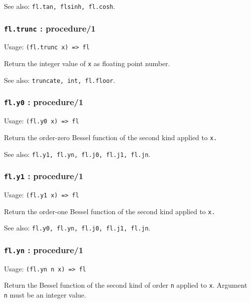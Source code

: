 \documentclass[
]{article}
\newcommand{\passthrough}[1]{#1}
\begin{document}
See also: \passthrough{\lstinline!fl.tan, flsinh, fl.cosh!}.

\hypertarget{fl.trunc-procedure1}{%
\subsubsection{\texorpdfstring{\texttt{fl.trunc} :
procedure/1}{fl.trunc : procedure/1}}\label{fl.trunc-procedure1}}

Usage: \passthrough{\lstinline!(fl.trunc x) => fl!}

Return the integer value of \passthrough{\lstinline!x!} as floating
point number.

See also: \passthrough{\lstinline!truncate, int, fl.floor!}.

\hypertarget{fl.y0-procedure1}{%
\subsubsection{\texorpdfstring{\texttt{fl.y0} :
procedure/1}{fl.y0 : procedure/1}}\label{fl.y0-procedure1}}

Usage: \passthrough{\lstinline!(fl.y0 x) => fl!}

Return the order-zero Bessel function of the second kind applied to
\passthrough{\lstinline!x.!}

See also: \passthrough{\lstinline!fl.y1, fl.yn, fl.j0, fl.j1, fl.jn!}.

\hypertarget{fl.y1-procedure1}{%
\subsubsection{\texorpdfstring{\texttt{fl.y1} :
procedure/1}{fl.y1 : procedure/1}}\label{fl.y1-procedure1}}

Usage: \passthrough{\lstinline!(fl.y1 x) => fl!}

Return the order-one Bessel function of the second kind applied to
\passthrough{\lstinline!x.!}

See also: \passthrough{\lstinline!fl.y0, fl.yn, fl.j0, fl.j1, fl.jn!}.

\hypertarget{fl.yn-procedure1}{%
\subsubsection{\texorpdfstring{\texttt{fl.yn} :
procedure/1}{fl.yn : procedure/1}}\label{fl.yn-procedure1}}

Usage: \passthrough{\lstinline!(fl.yn n x) => fl!}

Return the Bessel function of the second kind of order
\passthrough{\lstinline!n!} applied to \passthrough{\lstinline!x!}.
Argument \passthrough{\lstinline!n!} must be an integer value.
\end{document}
